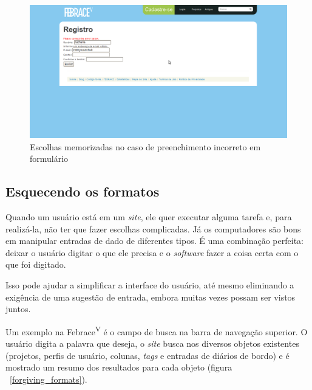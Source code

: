     \begin{figure}[h]
        \begin{center}
    \includegraphics[width=1.0\linewidth]{arquivos/remembered_choices.png}
        \end{center}
        \caption{Escolhas memorizadas no caso de preenchimento incorreto em formulário}
        \label{remembered_choices}
    \end{figure}

\subsection{Esquecendo os formatos}

Quando um usuário está em um \textit{site}, ele quer executar alguma tarefa e, para realizá-la, não ter que fazer escolhas complicadas. Já os computadores são bons em manipular entradas de dado de diferentes tipos. É uma combinação perfeita: deixar o usuário digitar o que ele precisa e o \textit{software} fazer a coisa certa com o que foi digitado.

Isso pode ajudar a simplificar a interface do usuário, até mesmo eliminando a exigência de uma sugestão de entrada, embora muitas vezes possam ser vistos juntos.

Um exemplo na Febrace\textsuperscript{V} é o campo de busca na barra de navegação superior. O usuário digita a palavra que deseja, o \textit{site} busca nos diversos objetos existentes (projetos, perfis de usuário, colunas, \textit{tags} e entradas de diários de bordo) e é mostrado um resumo dos resultados para cada objeto (figura ~\ref{forgiving_formats}).


